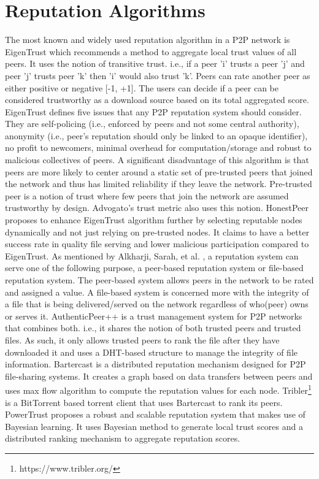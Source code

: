 \section{Reputation Algorithms}
The most known and widely used reputation algorithm in a P2P network is
EigenTrust \cite{kamvar2003eigentrust} which recommends a method to aggregate
local trust values of all peers. It uses the notion of transitive trust. i.e.,
if a peer 'i' trusts a peer 'j' and peer 'j' trusts peer 'k' then 'i' would
also trust 'k'. Peers can rate another peer as either positive or negative [-1,
+1]. The users can decide if a peer can be considered trustworthy as a download
source based on its total aggregated score. EigenTrust defines five issues that
any P2P reputation system should consider. They are self-policing (i.e.,
enforced by peers and not some central authority), anonymity (i.e., peer's
reputation should only be linked to an opaque identifier), no profit to
newcomers, minimal overhead for computation/storage and robust to malicious
collectives of peers. A significant disadvantage of this algorithm is that
peers are more likely to center around a static set of pre-trusted peers that
joined the network and thus has limited reliability if they leave the network.
Pre-trusted peer is a notion of trust where few peers that join the network are
assumed trustworthy by design. Advogato's trust metric \cite{levien2003advogato}
also uses this notion.  HonestPeer \cite{kurdi2015honestpeer} proposes to
enhance EigenTrust algorithm further by selecting reputable nodes dynamically
and not just relying on pre-trusted nodes. It claims to have a better success
rate in quality file serving and lower malicious participation compared to
EigenTrust.
As mentioned by Alkharji, Sarah, et al. \cite{alkharji2017authenticpeer++}, a
reputation system can serve one of the following purpose, a peer-based
reputation system or file-based reputation system. The peer-based system allows
peers in the network to be rated and assigned a value. A file-based system is
concerned more with the integrity of a file that is being delivered/served on
the network regardless of who(peer) owns or serves it.
AuthenticPeer++ \cite{alkharji2017authenticpeer++} is a trust management system
for P2P networks that combines both. i.e., it shares the notion of both trusted
peers and trusted files. As such, it only allows trusted peers to rank the file
after they have downloaded it and uses a DHT-based structure to manage the
integrity of file information. 
Bartercast \cite{meulpolder2009bartercast} is a distributed reputation mechanism
designed for P2P file-sharing systems. It creates a graph based on data
transfers between peers and uses max flow algorithm to compute the reputation
values for each node. Tribler\footnote{https://www.tribler.org/} is a
BitTorrent based torrent client that uses Bartercast to rank its peers. 
PowerTrust \cite{zhou2007powertrust} proposes a robust and scalable reputation
system that makes use of Bayesian learning. It
uses Bayesian method to generate local trust scores and a distributed ranking
mechanism to aggregate reputation scores. 

